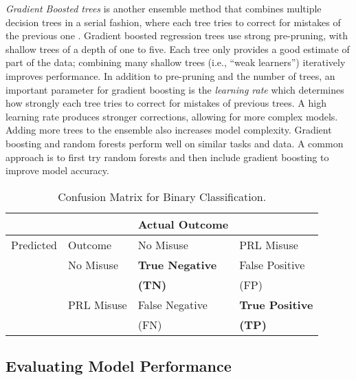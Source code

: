 \documentclass[sigconf]{acmart}
\begin{document}

\emph{Gradient Boosted trees} is another ensemble method that combines 
multiple decision trees in a serial fashion, where each tree tries to correct 
for mistakes of the previous one \cite{muller17}. Gradient boosted regression 
trees use strong pre-pruning, with shallow trees of a depth of one to five. 
Each tree only provides a good estimate of part of the data; combining many 
shallow trees (i.e., ``weak learners'') iteratively improves performance. 
In addition to pre-pruning and the number of trees, an important parameter 
for gradient boosting is the \emph{learning rate} which determines how 
strongly each tree tries to correct for mistakes of previous trees. A high 
learning rate produces stronger corrections, allowing for more complex models. 
Adding more trees to the ensemble also increases model complexity. Gradient 
boosting and random forests perform well on similar tasks and data. A common 
approach is to first try random forests and then include gradient boosting 
to improve model accuracy. 


\begin{table}
  \caption{Confusion Matrix for Binary Classification.}
  \label{tab:freq}
  \begin{tabular}{llll}
    \toprule
     & &  Actual Outcome & \\
    \midrule
    Predicted & Outcome & No Misuse & PRL Misuse \\
    \midrule
    & No Misuse & \textbf{True Negative} & False Positive \\
    & & \textbf{(TN)} & (FP) \\
    \midrule
    & PRL Misuse & False Negative & \textbf{True Positive} \\
    & & (FN) & \textbf{(TP)}  \\
    \bottomrule
  \end{tabular}
\end{table}


\subsection{Evaluating Model Performance}
\end{document}
